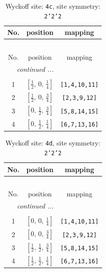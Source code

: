 \documentclass[fleqn,8pt]{jsarticle}
\begin{document}
\renewcommand{\arraystretch}{1.2}
\begin{longtable}{ccc}
\caption{Wyckoff site: {\tt 4c}, site symmetry: {\tt 2'2'2}}
 \\
 \hline \hline
No. & position & mapping \\ \hline \endfirsthead

\multicolumn{2}{l}{\tablename\ \thetable{}} \\
 \hline \hline
No. & position & mapping \\ \hline \endhead

 \hline \hline
\multicolumn{2}{r}{\footnotesize\it continued ...} \\ \endfoot

 \hline \hline
\multicolumn{2}{r}{} \\ \endlastfoot

1 & $\left[ \frac{1}{2},\, 0,\, \frac{1}{4} \right]$ & {\tt [1,4,10,11]} \\ \hline
2 & $\left[ \frac{1}{2},\, 0,\, \frac{3}{4} \right]$ & {\tt [2,3,9,12]} \\ \hline
3 & $\left[ 0,\, \frac{1}{2},\, \frac{3}{4} \right]$ & {\tt [5,8,14,15]} \\ \hline
4 & $\left[ 0,\, \frac{1}{2},\, \frac{1}{4} \right]$ & {\tt [6,7,13,16]} \\
\end{longtable}
\renewcommand{\arraystretch}{1.2}
\begin{longtable}{ccc}
\caption{Wyckoff site: {\tt 4d}, site symmetry: {\tt 2'2'2}}
 \\
 \hline \hline
No. & position & mapping \\ \hline \endfirsthead

\multicolumn{2}{l}{\tablename\ \thetable{}} \\
 \hline \hline
No. & position & mapping \\ \hline \endhead

 \hline \hline
\multicolumn{2}{r}{\footnotesize\it continued ...} \\ \endfoot

 \hline \hline
\multicolumn{2}{r}{} \\ \endlastfoot

1 & $\left[ 0,\, 0,\, \frac{1}{4} \right]$ & {\tt [1,4,10,11]} \\ \hline
2 & $\left[ 0,\, 0,\, \frac{3}{4} \right]$ & {\tt [2,3,9,12]} \\ \hline
3 & $\left[ \frac{1}{2},\, \frac{1}{2},\, \frac{3}{4} \right]$ & {\tt [5,8,14,15]} \\ \hline
4 & $\left[ \frac{1}{2},\, \frac{1}{2},\, \frac{1}{4} \right]$ & {\tt [6,7,13,16]} \\
\end{longtable}
\end{document}
